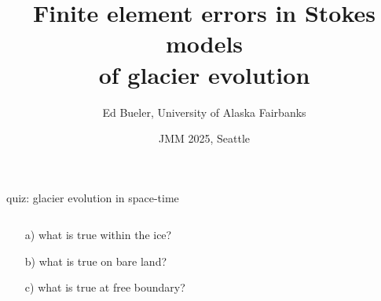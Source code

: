 \documentclass[10pt,dvipsnames]{beamer}
\title{Finite element errors in Stokes models \\ of glacier evolution}
\date{JMM 2025, Seattle}
\author{Ed Bueler, University of Alaska Fairbanks}
\theoremstyle{theorem}
\begin{document}
\graphicspath{{figs/}{../NWG24/figs/}{../../paper/figs/}}

\maketitle

\begin{frame}{quiz: glacier evolution in space-time }

\bigskip \bigskip

\begin{columns}
\begin{column}{0.28\textwidth}
\begin{itemize}
\item[a)] what is true within the {\color{RoyalBlue} ice}?
\item[b)] what is true on {\color{OliveGreen} bare land}?
\item[c)] what is true at {\color{Salmon} free boundary}?
\end{itemize}\end{column}
\begin{column}{0.72\textwidth}
\end{column}
\end{columns}
\end{frame}
\end{document}
